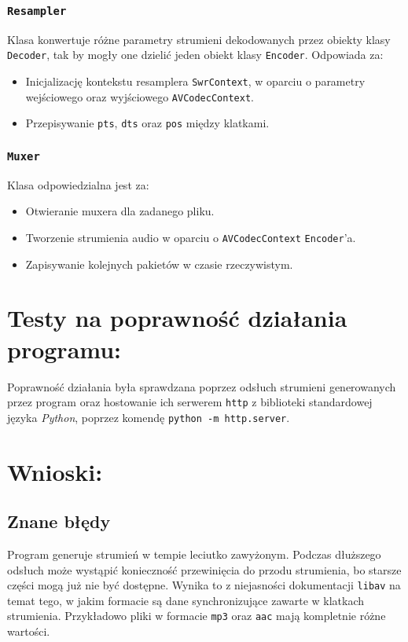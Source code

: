 \documentclass[a4paper,12pt]{article}
\begin{document}
\subsubsection{\texttt{Resampler}}

Klasa konwertuje różne parametry strumieni dekodowanych przez obiekty klasy
\texttt{Decoder}, tak by mogły one dzielić jeden obiekt klasy \texttt{Encoder}.
Odpowiada za: 
\begin{itemize}
    \item Inicjalizację kontekstu resamplera \texttt{SwrContext}, w oparciu o
        parametry wejściowego oraz wyjściowego \texttt{AVCodecContext}.
    \item Przepisywanie \texttt{pts}, \texttt{dts} oraz \texttt{pos} między klatkami.
\end{itemize}

\subsubsection{\texttt{Muxer}}

Klasa odpowiedzialna jest za: 
\begin{itemize}
    \item Otwieranie muxera dla zadanego pliku. 
    \item Tworzenie strumienia audio w oparciu o \texttt{AVCodecContext}
        \texttt{Encoder}'a.
    \item Zapisywanie kolejnych pakietów w czasie rzeczywistym.
\end{itemize}


\section{Testy na poprawność działania programu:}

Poprawność działania była sprawdzana poprzez odsłuch strumieni generowanych
przez program oraz hostowanie ich serwerem \texttt{http} z biblioteki
standardowej języka \emph{Python}, poprzez komendę \texttt{python -m
http.server}.

\section{Wnioski:}

\subsection{Znane błędy}

Program generuje strumień w tempie leciutko zawyżonym. Podczas dłuższego odsłuch
może wystąpić konieczność przewinięcia do przodu strumienia, bo starsze części
mogą już nie być dostępne. Wynika to z niejasności dokumentacji \texttt{libav}
na temat tego, w jakim formacie są dane synchronizujące zawarte w klatkach
strumienia. Przykładowo pliki w formacie \texttt{mp3} oraz \texttt{aac}
mają kompletnie różne wartości. 
\end{document}
